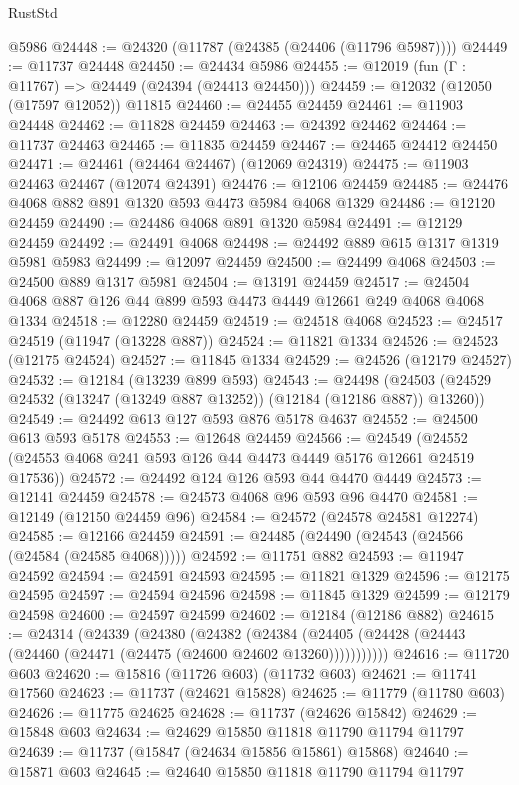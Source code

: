 \begin{lexlean}{RustStd}
\begin{coremodule}
    @5986
@24448 := @24320 (@11787 (@24385 (@24406 (@11796 @5987))))
@24449 := @11737 @24448
@24450 := @24434 @5986
@24455 := @12019 (fun (Γ : @11767) => @24449 (@24394 (@24413 @24450)))
@24459 := @12032 (@12050 (@17597 @12052)) @11815
@24460 := @24455 @24459
@24461 := @11903 @24448
@24462 := @11828 @24459
@24463 := @24392 @24462
@24464 := @11737 @24463
@24465 := @11835 @24459
@24467 := @24465 @24412 @24450
@24471 := @24461 (@24464 @24467) (@12069 @24319)
@24475 := @11903 @24463 @24467 (@12074 @24391)
@24476 := @12106 @24459
@24485 := @24476 @4068 @882 @891 @1320 @593 @4473 @5984 @4068 @1329
@24486 := @12120 @24459
@24490 := @24486 @4068 @891 @1320 @5984
@24491 := @12129 @24459
@24492 := @24491 @4068
@24498 := @24492 @889 @615 @1317 @1319 @5981 @5983
@24499 := @12097 @24459
@24500 := @24499 @4068
@24503 := @24500 @889 @1317 @5981
@24504 := @13191 @24459
@24517 := @24504 @4068 @887 @126 @44 @899 @593 @4473 @4449 @12661 @249 @4068 @4068 @1334
@24518 := @12280 @24459
@24519 := @24518 @4068
@24523 := @24517 @24519 (@11947 (@13228 @887))
@24524 := @11821 @1334
@24526 := @24523 (@12175 @24524)
@24527 := @11845 @1334
@24529 := @24526 (@12179 @24527)
@24532 := @12184 (@13239 @899 @593)
@24543 := @24498
    (@24503 (@24529 @24532 (@13247 (@13249 @887 @13252)) (@12184 (@12186 @887)) @13260))
@24549 := @24492 @613 @127 @593 @876 @5178 @4637
@24552 := @24500 @613 @593 @5178
@24553 := @12648 @24459
@24566 := @24549 (@24552 (@24553 @4068 @241 @593 @126 @44 @4473 @4449 @5176 @12661 @24519 @17536))
@24572 := @24492 @124 @126 @593 @44 @4470 @4449
@24573 := @12141 @24459
@24578 := @24573 @4068 @96 @593 @96 @4470
@24581 := @12149 (@12150 @24459 @96)
@24584 := @24572 (@24578 @24581 @12274)
@24585 := @12166 @24459
@24591 := @24485 (@24490 (@24543 (@24566 (@24584 (@24585 @4068)))))
@24592 := @11751 @882
@24593 := @11947 @24592
@24594 := @24591 @24593
@24595 := @11821 @1329
@24596 := @12175 @24595
@24597 := @24594 @24596
@24598 := @11845 @1329
@24599 := @12179 @24598
@24600 := @24597 @24599
@24602 := @12184 (@12186 @882)
@24615 := @24314
    (@24339
      (@24380
        (@24382
          (@24384 (@24405 (@24428 (@24443 (@24460 (@24471 (@24475 (@24600 @24602 @13260)))))))))))
@24616 := @11720 @603
@24620 := @15816 (@11726 @603) (@11732 @603)
@24621 := @11741 @17560
@24623 := @11737 (@24621 @15828)
@24625 := @11779 (@11780 @603)
@24626 := @11775 @24625
@24628 := @11737 (@24626 @15842)
@24629 := @15848 @603
@24634 := @24629 @15850 @11818 @11790 @11794 @11797
@24639 := @11737 (@15847 (@24634 @15856 @15861) @15868)
@24640 := @15871 @603
@24645 := @24640 @15850 @11818 @11790 @11794 @11797

\end{coremodule}
\end{lexlean}
